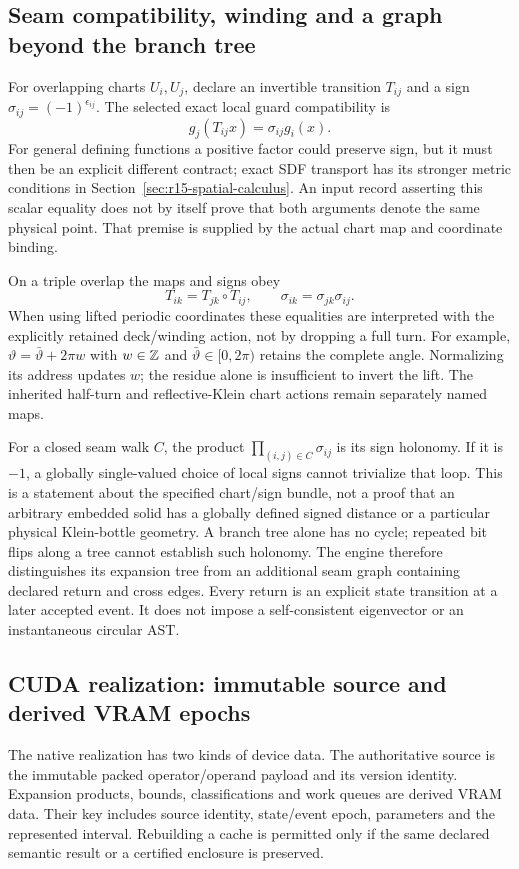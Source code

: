 \subsection{Seam compatibility, winding and a graph beyond the branch tree}
For overlapping charts $U_i,U_j$, declare an invertible transition $T_{ij}$
and a sign $\sigma_{ij}=(-1)^{\epsilon_{ij}}$. The selected exact local guard
compatibility is
\begin{equation}
 g_j(T_{ij}x)=\sigma_{ij}g_i(x).
 \label{eq:r15-sign-compatibility}
\end{equation}
For general defining functions a positive factor could preserve sign, but it
must then be an explicit different contract; exact SDF transport has its
stronger metric conditions in Section~\ref{sec:r15-spatial-calculus}.
An input record asserting this scalar equality does not by itself prove that
both arguments denote the same physical point. That premise is supplied by
the actual chart map and coordinate binding.

On a triple overlap the maps and signs obey
\begin{equation}
 T_{ik}=T_{jk}\circ T_{ij},\qquad
 \sigma_{ik}=\sigma_{jk}\sigma_{ij}.
 \label{eq:r15-cocycle}
\end{equation}
When using lifted periodic coordinates these equalities are interpreted with
the explicitly retained deck/winding action, not by dropping a full turn.
For example, $\vartheta=\bar\vartheta+2\pi w$ with $w\in\mathbb Z$ and
$\bar\vartheta\in[0,2\pi)$ retains the complete angle. Normalizing its address
updates $w$; the residue alone is insufficient to invert the lift. The inherited
half-turn and reflective-Klein chart actions remain separately named maps.

For a closed seam walk $C$, the product $\prod_{(i,j)\in C}\sigma_{ij}$ is
its sign holonomy. If it is $-1$, a globally single-valued choice of local
signs cannot trivialize that loop. This is a statement about the specified
chart/sign bundle, not a proof that an arbitrary embedded solid has a globally
defined signed distance or a particular physical Klein-bottle geometry.
A branch tree alone has no cycle; repeated bit flips along a tree cannot
establish such holonomy. The engine therefore distinguishes its expansion
tree from an additional seam graph containing declared return and cross edges.
Every return is an explicit state transition at a later accepted event. It
does not impose a self-consistent eigenvector or an instantaneous circular AST.

\subsection{CUDA realization: immutable source and derived VRAM epochs}
The native realization has two kinds of device data. The authoritative source
is the immutable packed operator/operand payload and its version identity.
Expansion products, bounds, classifications and work queues are derived VRAM
data. Their key includes source identity, state/event epoch, parameters and
the represented interval. Rebuilding a cache is permitted only if the same
declared semantic result or a certified enclosure is preserved.

